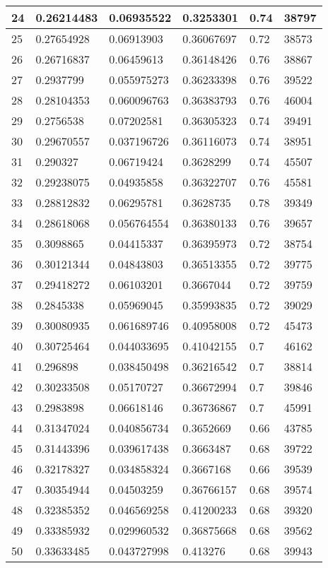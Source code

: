 \begin{longtable}{|l|l|l|l|l|l|}
24 & 0.26214483 & 0.06935522 & 0.3253301 & 0.74 & 38797 \\ \hline 
25 & 0.27654928 & 0.06913903 & 0.36067697 & 0.72 & 38573 \\ \hline 
26 & 0.26716837 & 0.06459613 & 0.36148426 & 0.76 & 38867 \\ \hline 
27 & 0.2937799 & 0.055975273 & 0.36233398 & 0.76 & 39522 \\ \hline 
28 & 0.28104353 & 0.060096763 & 0.36383793 & 0.76 & 46004 \\ \hline 
29 & 0.2756538 & 0.07202581 & 0.36305323 & 0.74 & 39491 \\ \hline 
30 & 0.29670557 & 0.037196726 & 0.36116073 & 0.74 & 38951 \\ \hline 
31 & 0.290327 & 0.06719424 & 0.3628299 & 0.74 & 45507 \\ \hline 
32 & 0.29238075 & 0.04935858 & 0.36322707 & 0.76 & 45581 \\ \hline 
33 & 0.28812832 & 0.06295781 & 0.3628735 & 0.78 & 39349 \\ \hline 
34 & 0.28618068 & 0.056764554 & 0.36380133 & 0.76 & 39657 \\ \hline 
35 & 0.3098865 & 0.04415337 & 0.36395973 & 0.72 & 38754 \\ \hline 
36 & 0.30121344 & 0.04843803 & 0.36513355 & 0.72 & 39775 \\ \hline 
37 & 0.29418272 & 0.06103201 & 0.3667044 & 0.72 & 39759 \\ \hline 
38 & 0.2845338 & 0.05969045 & 0.35993835 & 0.72 & 39029 \\ \hline 
39 & 0.30080935 & 0.061689746 & 0.40958008 & 0.72 & 45473 \\ \hline 
40 & 0.30725464 & 0.044033695 & 0.41042155 & 0.7 & 46162 \\ \hline 
41 & 0.296898 & 0.038450498 & 0.36216542 & 0.7 & 38814 \\ \hline 
42 & 0.30233508 & 0.05170727 & 0.36672994 & 0.7 & 39846 \\ \hline 
43 & 0.2983898 & 0.06618146 & 0.36736867 & 0.7 & 45991 \\ \hline 
44 & 0.31347024 & 0.040856734 & 0.3652669 & 0.66 & 43785 \\ \hline 
45 & 0.31443396 & 0.039617438 & 0.3663487 & 0.68 & 39722 \\ \hline 
46 & 0.32178327 & 0.034858324 & 0.3667168 & 0.66 & 39539 \\ \hline 
47 & 0.30354944 & 0.04503259 & 0.36766157 & 0.68 & 39574 \\ \hline 
48 & 0.32385352 & 0.046569258 & 0.41200233 & 0.68 & 39320 \\ \hline 
49 & 0.33385932 & 0.029960532 & 0.36875668 & 0.68 & 39562 \\ \hline 
50 & 0.33633485 & 0.043727998 & 0.413276 & 0.68 & 39943 \\ \hline 
\end{longtable}